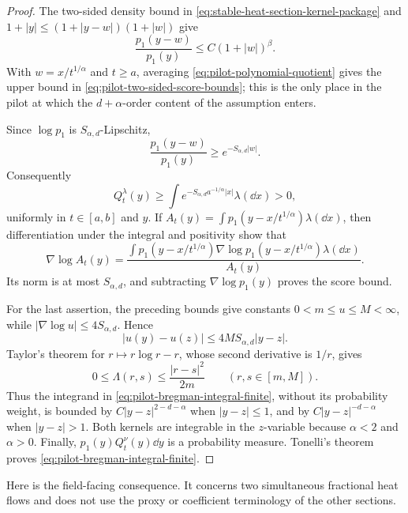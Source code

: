 \begin{proof}
The two-sided density bound in
\eqref{eq:stable-heat-section-kernel-package} and
\(1+|y|\le(1+|y-w|)(1+|w|)\) give
\begin{equation}\label{eq:pilot-polynomial-quotient}
 \frac{p_1(y-w)}{p_1(y)}\le C(1+|w|)^\beta.
\end{equation}
With \(w=x/t^{1/\alpha}\) and \(t\ge a\), averaging
\eqref{eq:pilot-polynomial-quotient} gives the upper bound in
\eqref{eq:pilot-two-sided-score-bounds}; this is the only place in the
pilot at which the \(d+\alpha\)-order content of the assumption enters.

Since \(\log p_1\) is \(S_{\alpha,d}\)-Lipschitz,
\[
 \frac{p_1(y-w)}{p_1(y)}\ge e^{-S_{\alpha,d}|w|}.
\]
Consequently
\[
 Q_t^\lambda(y)\ge
 \int e^{-S_{\alpha,d}a^{-1/\alpha}|x|}\lambda(\dd x)>0,
\]
uniformly in \(t\in[a,b]\) and \(y\).  If
\(A_t(y)=\int p_1(y-x/t^{1/\alpha})\lambda(\dd x)\), then differentiation
under the integral and positivity show that
\[
 \nabla\log A_t(y)
 =\frac{\int p_1(y-x/t^{1/\alpha})
 \nabla\log p_1(y-x/t^{1/\alpha})\lambda(\dd x)}{A_t(y)}.
\]
Its norm is at most \(S_{\alpha,d}\), and subtracting
\(\nabla\log p_1(y)\) proves the score bound.

For the last assertion, the preceding bounds give constants
\(0<m\le u\le M<\infty\), while
\(|\nabla\log u|\le4S_{\alpha,d}\).  Hence
\begin{equation}\label{eq:pilot-u-lipschitz}
 |u(y)-u(z)|\le4MS_{\alpha,d}|y-z|.
\end{equation}
Taylor's theorem for \(r\mapsto r\log r-r\), whose second derivative is
\(1/r\), gives
\begin{equation}\label{eq:pilot-lambda-quadratic}
 0\le\Lambda(r,s)\le\frac{|r-s|^2}{2m}
 \qquad(r,s\in[m,M]).
\end{equation}
Thus the integrand in \eqref{eq:pilot-bregman-integral-finite}, without its
probability weight, is bounded by \(C|y-z|^{2-d-\alpha}\) when
\(|y-z|\le1\), and by \(C|y-z|^{-d-\alpha}\) when
\(|y-z|>1\).  Both kernels are integrable in the \(z\)-variable because
\(\alpha<2\) and \(\alpha>0\).  Finally,
\(p_1(y)Q_t^\nu(y)\dd y\) is a probability measure.  Tonelli's theorem
proves \eqref{eq:pilot-bregman-integral-finite}.
\end{proof}

Here is the field-facing consequence.  It concerns two simultaneous
fractional heat flows and does not use the proxy or coefficient terminology
of the other sections.

